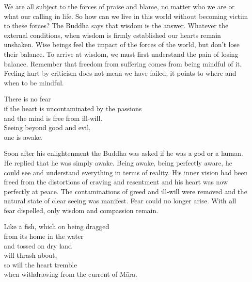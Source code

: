 \begin{dhpRefl}
We are all subject to the forces of praise and blame, no matter who we are or what our calling in life. So how can we live in this world without becoming victim to these forces? The Buddha says that wisdom is the answer. Whatever the external conditions, when wisdom is firmly established our hearts remain unshaken. Wise beings feel the impact of the forces of the world, but don't lose their balance. To arrive at wisdom, we must first understand the pain of losing balance. Remember that freedom from suffering comes from being mindful of it. Feeling hurt by criticism does not mean we have failed; it points to where and when to be mindful.
\end{dhpRefl}


\begin{dhpVerse}{39}
\label{dhp-39}
There is no fear\\
if the heart is uncontaminated by the passions\\
and the mind is free from ill-will.\\
Seeing beyond good and evil,\\
one is awake.
\end{dhpVerse}

\begin{dhpRefl}
Soon after his enlightenment the Buddha was asked if he was a god or a human. He replied that he was simply awake. Being awake, being perfectly aware, he could see and understand everything in terms of reality. His inner vision had been freed from the distortions of craving and resentment and his heart was now perfectly at peace. The contaminations of greed and ill-will were removed and the natural state of clear seeing was manifest. Fear could no longer arise. With all fear dispelled, only wisdom and compassion remain.
\end{dhpRefl}


\begin{dhpVerse}{34}
\label{dhp-34}
Like a fish, which on being dragged\\
from its home in the water\\
and tossed on dry land\\
will thrash about,\\
so will the heart tremble\\
when withdrawing from the current of Māra.
\end{dhpVerse}

